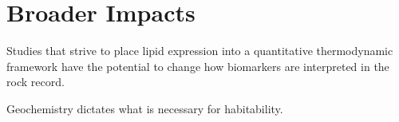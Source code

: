 
\section{Broader Impacts}

Studies that strive to place lipid expression into a quantitative thermodynamic framework have the potential to change how biomarkers are interpreted in the rock record.



Geochemistry dictates what is necessary for habitability.


